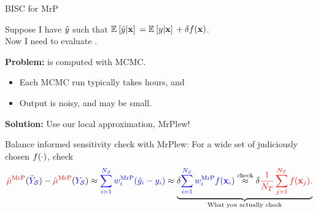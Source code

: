 
\begin{frame}[t]{BISC for MrP}

Suppose I have
$\ytil$ such that $\expect{}{\ytil \vert \x} = \expect{}{\y \vert \x} + \delta f(\x)$.\\
Now I need to evaluate \surcol{$\muhatmrp[\ytil] - \muhatmrp$}.
\pause

\textbf{Problem:} \surcol{$\muhatmrp[\cdot]$} is computed with MCMC.
%
\begin{itemize}
\item Each MCMC run typically takes hours, and
\item Output is noisy, and \surcol{$\muhatmrp[\ytil] - \muhatmrp$} may be small.
\end{itemize}
%
\pause
\textbf{Solution:} Use our local approximation, MrPlew!

\begin{block}{Balance informed sensitivity check with MrPlew:}
For a wide set of judiciously chosen $\f(\cdot)$, check
$$
\muhatmrp[\Ytil] - \muhatmrp \approx
    \surcol{\sumsur \w_i^\mrp (\ytil_i - \y_i)} \approx
    \underbrace{
        \delta  \surcol{\sumsur \w_i^\mrp \f(\x_i)}
            \overset{\textrm{check}}{\approx}
        \delta \tarcol{\meantar f(\x_j).}
    }_{\textrm{What you actually check}}
$$
\end{block}



\end{frame}




